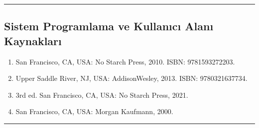 \documentclass[a4paper,10pt,turkish]{sphinxmanual}
\begin{document}
\bigskip\hrule\bigskip



\subsection{Sistem Programlama ve Kullanıcı Alanı Kaynakları}
\label{\detokenize{introduction:sistem-programlama-ve-kullanici-alani-kaynaklari}}\begin{enumerate}
%
\item {} \begin{description}
\sphinxAtStartPar
San Francisco, CA, USA: No Starch Press, 2010.
ISBN: 978\sphinxhyphen{}1\sphinxhyphen{}593\sphinxhyphen{}27220\sphinxhyphen{}3.

\end{description}

\item {} \begin{description}
\sphinxAtStartPar
Upper Saddle River, NJ, USA: Addison\sphinxhyphen{}Wesley, 2013.
ISBN: 978\sphinxhyphen{}0\sphinxhyphen{}321\sphinxhyphen{}63773\sphinxhyphen{}4.

\end{description}

\item {} \begin{description}
\sphinxAtStartPar
3rd ed.
San Francisco, CA, USA: No Starch Press, 2021.

\end{description}

\item {} \begin{description}
\sphinxAtStartPar
San Francisco, CA, USA: Morgan Kaufmann, 2000.

\end{description}

\end{enumerate}


\bigskip\hrule\bigskip
\end{document}
